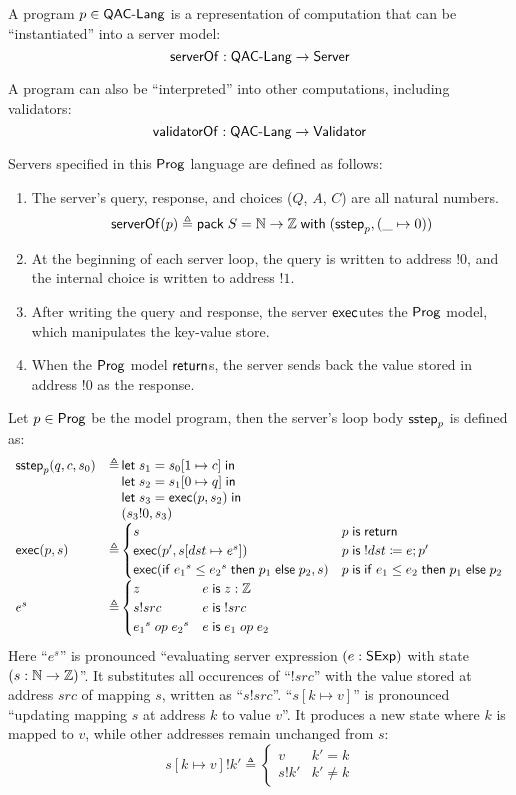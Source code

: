 \begin{definition}
  A program $p\in\textsf{QAC-Lang}$ is a representation of computation that can be
  ``instantiated'' into a server model:
  \[\mathsf{serverOf}:\textsf{QAC-Lang}\to\mathsf{Server}\]
  
  A program can also be ``interpreted'' into other computations, including
  validators:
  \[\mathsf{validatorOf}:\textsf{QAC-Lang}\to\mathsf{Validator}\]
\end{definition}

Servers specified in this $\mathsf{Prog}$ language are defined as follows:
\begin{enumerate}
\item The server's query, response, and choices ($Q$, $A$, $C$) are all
  natural numbers.
  \[\mathsf{serverOf}(p)\triangleq\mathsf{pack}\;S=\mathbb N\to\mathbb Z\;\mathsf{with}\;(\mathsf{sstep}_p,(\_\mapsto0))\]
\item At the beginning of each server loop, the query is written to address
  $!0$, and the internal choice is written to address $!1$.
\item After writing the query and response, the server $\mathsf{exec}$utes the $\mathsf{Prog}$
  model, which manipulates the key-value store.
\item When the $\mathsf{Prog}$ model $\mathsf{return}$s, the server sends back the value stored
  in address $!0$ as the response.
\end{enumerate}
Let $p\in\mathsf{Prog}$ be the model program, then the server's loop body $\mathsf{sstep}_p$ is
defined as:
\[\begin{array}{lr@{\,}l}
\sstep_p(q,c,s_0)&\triangleq&\letin{s_1}{\update{s_0}{1}{c}}\\
&&\letin{s_2}{\update{s_1}{0}{q}}\\
&&\letin{s_3}{\Exec(p,s_2)}\\
&&(s_3!0,s_3)\\
\Exec(p,s)&\triangleq&
\begin{cases}
  s&p\Is\Return\\
  \Exec(p',\update{s}{dst}{e^s})&p\Is !dst\coloneqq e;p'\\
  \Exec(\If {e_1}^s\le{e_2}^s\Then p_1\Else p_2,s)&p\Is\If e_1\le e_2\Then p_1\Else p_2
\end{cases}\\
e^s&\triangleq&
\begin{cases}
  z&e\Is z:\Int\\
  s!src&e\Is !src\\
  {e_1}^s\oop{e_2}^s&e\Is e_1\oop e_2
\end{cases}
\end{array}\]
Here ``$e^s$'' is pronounced ``evaluating server expression $(e:\mathsf{SExp})$ with
state $(s:\mathbb N\to\mathbb Z)$''.  It substitutes all occurences of ``$!src$'' with the
value stored at address $src$ of mapping $s$, written as ``$s!src$''.
``$s[k\mapsto v]$'' is pronounced ``updating mapping $s$ at address $k$ to value
$v$''.  It produces a new state where $k$ is mapped to $v$, while other
addresses remain unchanged from $s$:
\[s[k\mapsto v]!k'\triangleq\begin{cases}v&k'=k\\
s!k'&k'\neq k\end{cases}\]

